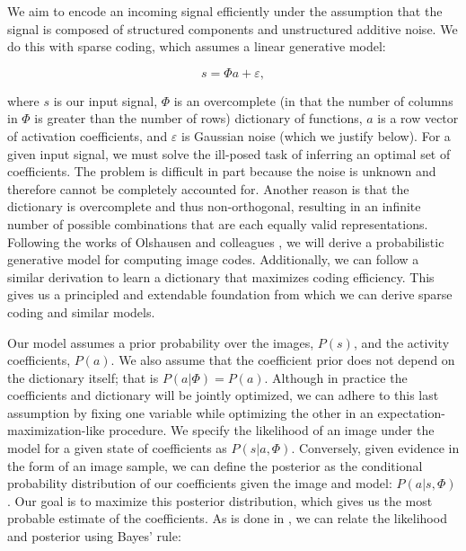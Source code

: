 We aim to encode an incoming signal efficiently under the assumption that the signal is composed of structured components and unstructured additive noise. We do this with sparse coding, which assumes a linear generative model:

\begin{equation} \label{eq:ch2_sparse_generative_model}
    s = \Phi a + \varepsilon,
\end{equation}

\noindent where $s$ is our input signal, $\Phi$ is an overcomplete (in that the number of columns in $\Phi$ is greater than the number of rows) dictionary of functions, $a$ is a row vector of activation coefficients, and $\varepsilon$ is Gaussian noise (which we justify below). For a given input signal, we must solve the ill-posed task of inferring an optimal set of coefficients. The problem is difficult in part because the noise is unknown and therefore cannot be completely accounted for. Another reason is that the dictionary is overcomplete and thus non-orthogonal, resulting in an infinite number of possible combinations that are each equally valid representations. Following the works of Olshausen and colleagues \parencite{olshausen1996learning, olshausen2003principles, karklin1999porbabilistic}, we will derive a probabilistic generative model for computing image codes. Additionally, we can follow a similar derivation to learn a dictionary that maximizes coding efficiency. This gives us a principled and extendable foundation from which we can derive sparse coding and similar models.

Our model assumes a prior probability over the images, $P(s)$, and the activity coefficients, $P(a)$. We also assume that the coefficient prior does not depend on the dictionary itself; that is $P(a|\Phi) = P(a)$. Although in practice the coefficients and dictionary will be jointly optimized, we can adhere to this last assumption by fixing one variable while optimizing the other in an expectation-maximization-like procedure. We specify the likelihood of an image under the model for a given state of coefficients as $P(s|a,\Phi)$. Conversely, given evidence in the form of an image sample, we can define the posterior as the conditional probability distribution of our coefficients given the image and model: $P(a|s,\Phi)$. Our goal is to maximize this posterior distribution, which gives us the most probable estimate of the coefficients. As is done in \parencite{karklin1999porbabilistic}, we can relate the likelihood and posterior using Bayes' rule:

